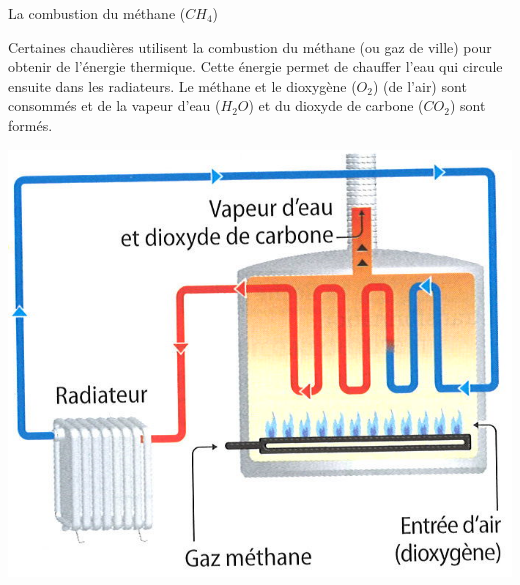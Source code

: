 \documentclass[a4paper,11pt]{exam}
\begin{document}
\begin{doc}
	\caption{La combustion du méthane ($CH_4$)}
	\label{doc:méthane}
		
	\begin{multicols}{2}
		
		\vspace*{1cm}
		Certaines chaudières utilisent la combustion du méthane (ou gaz de ville) pour obtenir de l'énergie thermique. Cette énergie permet de chauffer l'eau qui circule ensuite dans les radiateurs. Le méthane et le dioxygène ($O_2$) (de l'air) sont consommés et de la vapeur d'eau ($H_2O$) et du dioxyde de carbone ($CO_2$) sont formés.
			
		\begin{center}
			\includegraphics[scale=0.35]{methane}
		\end{center}
	\end{multicols}
\end{doc}

\newpage
\end{document}
